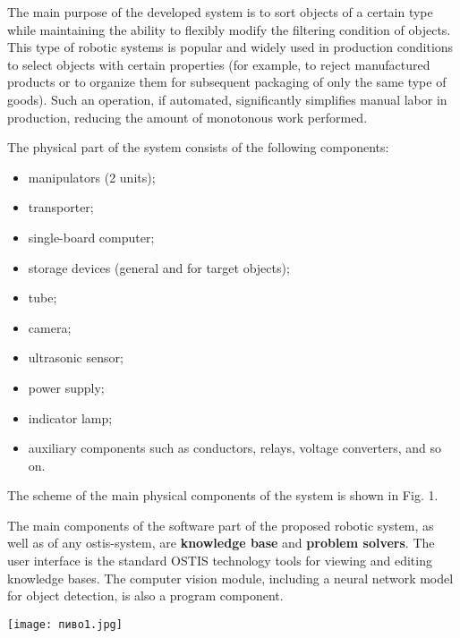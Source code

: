 \documentclass[10pt, letterpaper, twoside]{article}
\begin{document}
\begin{multicols}{2}
The main purpose of the developed system is to sort
objects of a certain type while maintaining the ability to
flexibly modify the filtering condition of objects. This
type of robotic systems is popular and widely used
in production conditions to select objects with certain
properties (for example, to reject manufactured products
or to organize them for subsequent packaging of only the
same type of goods). Such an operation, if automated, significantly
simplifies manual labor in production, reducing
the amount of monotonous work performed.

The physical part of the system consists of the following
components:
\begin{itemize}[noitemsep]
\item manipulators (2 units);

\item transporter;

\item single-board computer;

\item storage devices (general and for target objects);

\item tube;

\item camera;

\item ultrasonic sensor;

\item power supply;

\item indicator lamp;

\item auxiliary components such as conductors, relays,
voltage converters, and so on.
 \end{itemize}
The scheme of the main physical components of the
system is shown in Fig. 1.

The main components of the software part of the
proposed robotic system, as well as of any ostis-system,
are \textbf{knowledge base} and \textbf{problem solvers}. The user interface is the standard OSTIS technology tools for
viewing and editing knowledge bases. The computer
vision module, including a neural network model for
object detection, is also a program component.
\begin{center}
\begin{minipage}{.4\textwidth}
    \texttt{[image: пиво1.jpg]}
    \scriptsize
    \begin{center}
        


\end{center}
\end{minipage}
\end{center}
\end{multicols}
\end{document}
